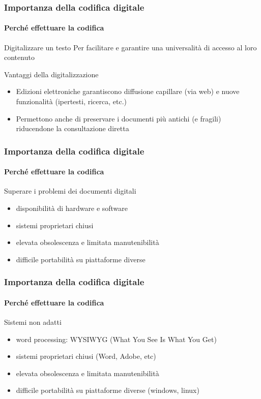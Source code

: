 \begin{frame}
	\frametitle{Importanza della codifica digitale}
	\framesubtitle{Perché effettuare la codifica}
	\addtocounter{nframe}{1}

	\begin{block}{Digitalizzare un testo}
		Per facilitare e garantire una universalità di accesso al loro contenuto
	\end{block}

	\begin{block}{Vantaggi della digitalizzazione}
		\begin{itemize}
			\item Edizioni elettroniche garantiscono diffusione capillare
			      (via web) e nuove funzionalità (ipertesti, ricerca, etc.)
			\item Permettono anche di preservare i documenti più antichi
			      (e fragili) riducendone la consultazione diretta
		\end{itemize}
	\end{block}
\end{frame}

\begin{frame}
	\frametitle{Importanza della codifica digitale}
	\framesubtitle{Perché effettuare la codifica}
	\addtocounter{nframe}{1}

	\begin{block}{Superare i problemi dei documenti digitali}
		\begin{itemize}
			\item disponibilità di hardware e software
			\item sistemi proprietari chiusi
			\item elevata obsolescenza e limitata manutenibilità
			\item difficile portabilità su piattaforme diverse
		\end{itemize}
	\end{block}

\end{frame}

\begin{frame}
	\frametitle{Importanza della codifica digitale}
	\framesubtitle{Perché effettuare la codifica}
	\addtocounter{nframe}{1}

	\begin{block}{Sistemi non adatti}
		\begin{itemize}
			\item word processing: WYSIWYG (What You See Is What You Get)
			\item sistemi proprietari chiusi (Word, Adobe, etc)
			\item elevata obsolescenza e limitata manutenibilità
			\item difficile portabilità su piattaforme diverse (windows, linux)
		\end{itemize}
	\end{block}

\end{frame}

